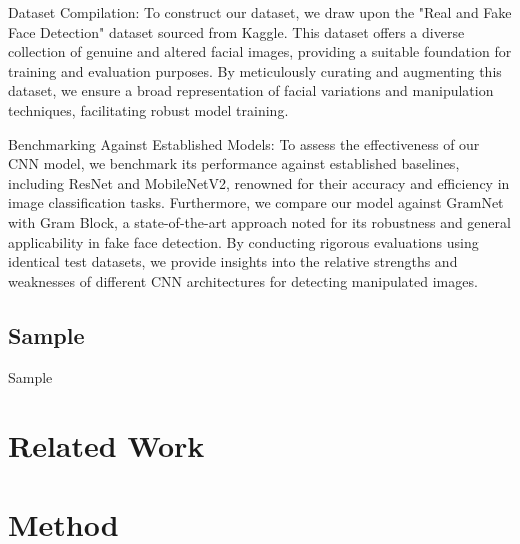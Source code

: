 \documentclass[rebuttal]{cvpr}
\begin{document}
Dataset Compilation:
To construct our dataset, we draw upon the "Real and Fake Face Detection" dataset sourced from Kaggle. This dataset offers a diverse collection of genuine and altered facial images, providing a suitable foundation for training and evaluation purposes. By meticulously curating and augmenting this dataset, we ensure a broad representation of facial variations and manipulation techniques, facilitating robust model training.
 
Benchmarking Against Established Models:
To assess the effectiveness of our CNN model, we benchmark its performance against established baselines, including ResNet and MobileNetV2, renowned for their accuracy and efficiency in image classification tasks. Furthermore, we compare our model against GramNet with Gram Block, a state-of-the-art approach noted for its robustness and general applicability in fake face detection. By conducting rigorous evaluations using identical test datasets, we provide insights into the relative strengths and weaknesses of different CNN architectures for detecting manipulated images.


\subsection{Sample}
Sample

\section{Related Work}
\section{Method}
\end{document}
